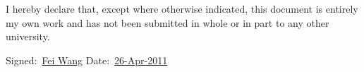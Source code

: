 
\begin{dedication} %
I hereby declare that, except where otherwise indicated, this document is entirely my own work and has not been submitted in whole or in part to any other university.


\vspace*{5ex}

{Signed:\, \underline{Fei Wang}}
\hspace*{54mm}
{Date:\, \underline{26-Apr-2011}}


\end{dedication}


